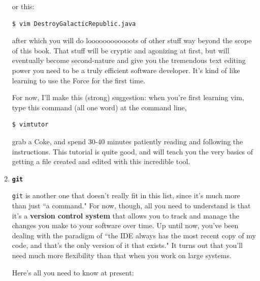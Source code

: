 \begin{enumerate}
or this:

\begin{verbatim}
$ vim DestroyGalacticRepublic.java
\end{verbatim}

after which you will do loooooooooooots of other stuff way beyond the scope of
this book. That stuff will be cryptic and agonizing at first, but will
eventually become second-nature and give you the tremendous text editing power
you need to be a truly efficient software developer. It's kind of like
learning to use the Force for the first time.

For now, I'll make this (strong) suggestion: when you're first learning vim,
type this command (all one word) at the command line,

\begin{verbatim}
$ vimtutor
\end{verbatim}

grab a Coke, and spend 30-40 minutes patiently reading and following the
instructions. This tutorial is quite good, and will teach you the very basics
of getting a file created and edited with this incredible tool.

\bigline

\item \textbf{\texttt{git}}
\label{introduceGit}

\texttt{git} is another one that doesn't really fit in this list, since it's
much more than just ``a command." For now, though, all you need to understand
is that it's a \textbf{version control system} that allows you to track and
manage the changes you make to your software over time. Up until now, you've
been dealing with the paradigm of ``the IDE always has the most recent copy of
my code, and that's the only version of it that exists." It turns out that
you'll need much more flexibility than that when you work on large systems.

Here's all you need to know at present:


\end{enumerate}
